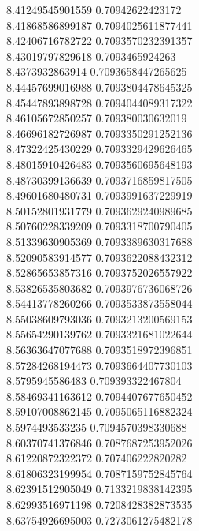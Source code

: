 {8.41249545901559 0.70942622423172 \\
8.41868586899187 0.7094025611877441 \\
8.42406716782722 0.7093570232391357 \\
8.43019797829618 0.7093465924263 \\
8.4373932863914 0.7093658447265625 \\
8.44457699016988 0.7093804478645325 \\
8.45447893898728 0.7094044089317322 \\
8.46105672850257 0.709380030632019 \\
8.46696182726987 0.7093350291252136 \\
8.47322425430229 0.7093329429626465 \\
8.48015910426483 0.7093560695648193 \\
8.48730399136639 0.7093716859817505 \\
8.49601680480731 0.7093991637229919 \\
8.50152801931779 0.7093629240989685 \\
8.50760228339209 0.7093318700790405 \\
8.51339630905369 0.7093389630317688 \\
8.52090583914577 0.7093622088432312 \\
8.52865653857316 0.7093752026557922 \\
8.53826535803682 0.7093976736068726 \\
8.54413778260266 0.7093533873558044 \\
8.55038609793036 0.7093213200569153 \\
8.55654290139762 0.7093321681022644 \\
8.56363647077688 0.7093518972396851 \\
8.57284268194473 0.7093664407730103 \\
8.5795945586483 0.709393322467804 \\
8.58469341163612 0.7094407677650452 \\
8.59107008862145 0.7095065116882324 \\
8.5974493533235 0.7094570398330688 \\
8.60370741376846 0.7087687253952026 \\
8.61220872322372 0.707406222820282 \\
8.61806323199954 0.7087159752845764 \\
8.62391512905049 0.7133219838142395 \\
8.62993516971198 0.7208428382873535 \\
8.63754926695003 0.7273061275482178 \\
}
